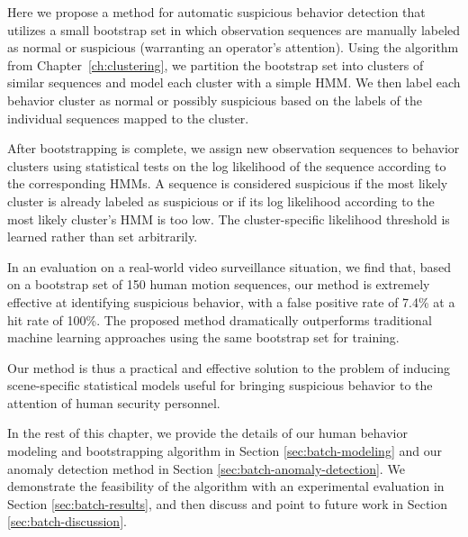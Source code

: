 
Here we propose a method for automatic suspicious behavior detection
that utilizes a small bootstrap set in which observation sequences are
manually labeled as normal or suspicious (warranting an operator's
attention).  Using the algorithm from Chapter~\ref{ch:clustering}, we
partition the bootstrap set into clusters of similar sequences and
model each cluster with a simple HMM. We then label each behavior
cluster as normal or possibly suspicious based on the labels of the
individual sequences mapped to the cluster.

After bootstrapping is complete, we assign new observation sequences
to behavior clusters using statistical tests on the log likelihood of
the sequence according to the corresponding HMMs.  A sequence is
considered suspicious if the most likely cluster is already labeled as
suspicious or if its log likelihood according to the most likely
cluster's HMM is too low.  The cluster-specific likelihood threshold
is learned rather than set arbitrarily.

In an evaluation on a real-world video surveillance situation, we find
that, based on a bootstrap set of 150 human motion sequences, our
method is extremely effective at identifying suspicious behavior, with
a false positive rate of 7.4\% at a hit rate of 100\%.  The proposed
method dramatically outperforms traditional machine learning
approaches using the same bootstrap set for training.

Our method is thus a practical and effective solution to the problem
of inducing scene-specific statistical models useful for bringing
suspicious behavior to the attention of human security personnel.

In the rest of this chapter, we provide the details of our human
behavior modeling and bootstrapping algorithm in
Section \ref{sec:batch-modeling} and our anomaly detection method in
Section \ref{sec:batch-anomaly-detection}. We demonstrate the feasibility
of the algorithm with an experimental evaluation in
Section \ref{sec:batch-results}, and then discuss and point to future
work in Section \ref{sec:batch-discussion}.

